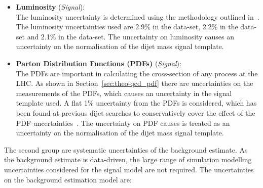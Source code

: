 \begin{itemize}[leftmargin=*]
  \vspace{0.5em}
\item\textbf{Luminosity} \hspace{1mm} (\textit{Signal}):\\
  The luminosity uncertainty is determined using the methodology outlined in~\cite{lim-syst_lumi}.
  The luminosity uncertainties used are 2.9\% in the \summer{} data-set,
  2.2\% in the \lm{} data-set
  and 2.1\% in the \hm{} data-set.
  The uncertainty on luminosity causes an uncertainty on the normalisation of the dijet mass signal template.
  \vspace{0.5em}
\item\textbf{Parton Distribution Functions (PDFs) } \hspace{1mm}  (\textit{Signal}):\\
  The PDFs are important in calculating the cross-section of any process at the LHC.
  As shown in Section~\ref{sec:theo-qcd_pdf} there are uncertainties on the measurements of the PDFs,
  which causes an uncertainty in the signal template used.
  A flat 1\% uncertainty from the PDFs is considered,
  which has been found at previous dijet searches to conservatively cover
  the effect of the PDF uncertainties~\cite{dijet-mori16_paper}.
  The uncertainty on PDF causes is treated as an uncertainty on the normalisation of the dijet mass signal template.
  \vspace{0.5em}
\end{itemize}

The second group are systematic uncertainties of the background estimate.
As the background estimate is data-driven,
the large range of simulation modelling uncertainties considered for the signal model are not required.
The uncertainties on the background estimation model are:

